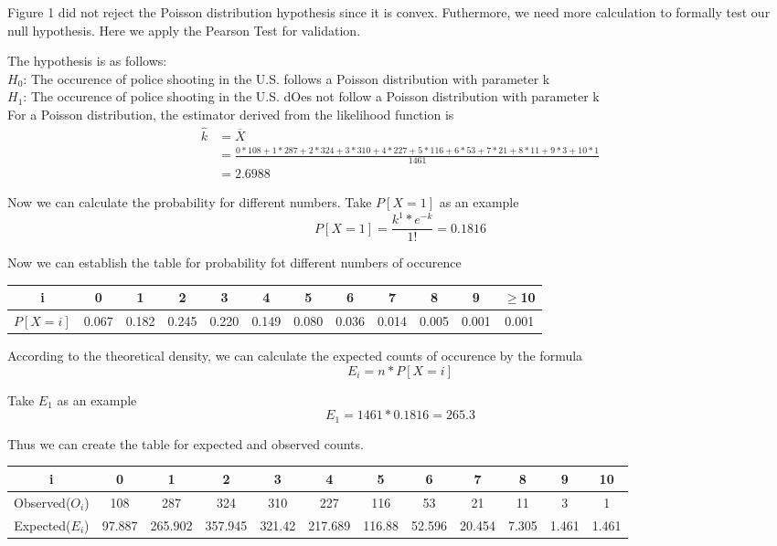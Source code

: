 \documentclass[11pt,a4paper,english]{article}
\begin{document}
Figure 1 did not reject the Poisson distribution hypothesis since it is convex. Futhermore, we need more calculation to formally test our null hypothesis. Here we apply the Pearson Test for validation.

The hypothesis is as follows:\\
$H_{0}$: The occurence of police shooting in the U.S. follows a Poisson distribution with parameter k\\
$H_{1}$: The occurence of police shooting in the U.S. dOes not follow a Poisson distribution with parameter k\\

For a Poisson distribution, the estimator derived from the likelihood function is 
\begin{align}
\hat{k}&= \overline{X}\\&=\frac{0*108+1*287+2*324+3*310+4*227+5*116+6*53+7*21+8*11+9*3+10*1}{1461}\\&=2.6988
\end{align}

Now we can calculate the probability for different numbers. Take $P[X=1]$ as an example
$$
P[X=1] = \frac{k^{1}*e^{-k}}{1!}=0.1816
$$

Now we can establish the table for probability fot different numbers of occurence

\begin{table}[!htbp]
\centering
\begin{tabular}{|cccccccccccc|}
\hline
i&0&1&2&3&4&5&6&7&8&9&$\geq$10\\
\hline
$P[X=i]$&0.067&0.182&0.245&0.220&0.149&0.080&0.036&0.014&0.005&0.001&0.001\\


\hline
\end{tabular}
\end{table}



According to the theoretical density, we can calculate the expected counts of occurence by the formula
$$
E_{i}= n * P[X=i] 
$$

Take $E_{1}$ as an example
$$
E_{1}= 1461*0.1816 =265.3
$$

Thus we can create the table for expected and observed counts.
\begin{table}[!htbp]
\centering
\begin{tabular}{|cccccccccccc|}
\hline
i&0&1&2&3&4&5&6&7&8&9&10\\
\hline
Observed($O_{i}$)&108&287&324&310&227&116&53&21&11&3&1\\
\hline
Expected($E_{i}$)&97.887&265.902&357.945&321.42&217.689&116.88&52.596&20.454&7.305&1.461& 1.461\\
\hline
\end{tabular}
\end{table}
\end{document}

